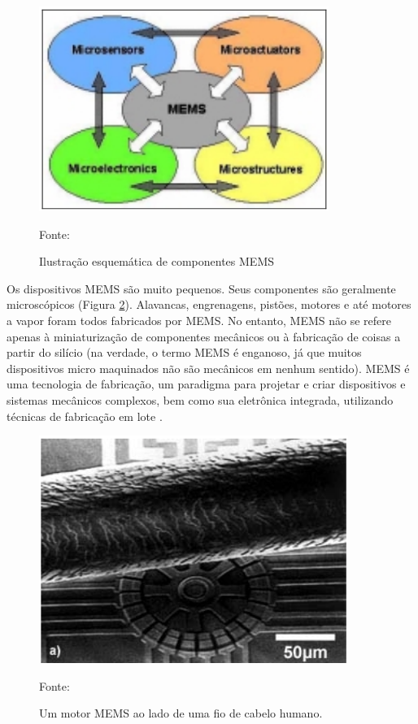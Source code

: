 		\begin{figure}[h]
			\centering
			\includegraphics[keepaspectratio=true,scale=0.5
			]{figuras/esquematico_mems.png}
			\caption{Ilustração esquemática de componentes MEMS}
			Fonte: \cite{prime2002}
			\label{esquematico_mems}
		\end{figure}

		Os dispositivos MEMS são muito pequenos. Seus componentes são geralmente microscópicos (Figura \ref{escala_mems}). Alavancas, engrenagens, pistões, motores e até motores a vapor foram todos fabricados por MEMS. No entanto, MEMS não se refere apenas à miniaturização de componentes mecânicos ou à fabricação de coisas a partir do silício (na verdade, o termo MEMS é enganoso, já que muitos dispositivos micro maquinados não são mecânicos em nenhum sentido). MEMS é uma tecnologia de fabricação, um paradigma para projetar e criar dispositivos e sistemas mecânicos complexos, bem como sua eletrônica integrada, utilizando técnicas de fabricação em lote \cite{prime2002}.

		\begin{figure}[h]
			\centering
			\includegraphics[keepaspectratio=true,scale=0.5
			]{figuras/escala_mems.png}
			\caption{Um motor MEMS ao lado de uma fio de cabelo humano.}
			Fonte: \cite{prime2002}
			\label{escala_mems}
		\end{figure}

